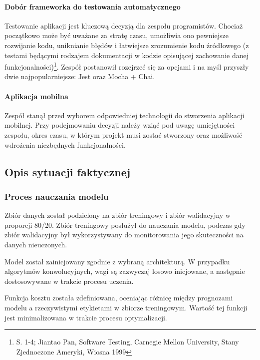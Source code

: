 \documentclass[12pt, a4paper, twoside, openany]{book}
\newcommand{\forceindent}{\leavevmode{\parindent=1.3em\indent}}
\begin{document}
\paragraph{Dobór frameworka do testowania automatycznego\\}
\forceindent Testowanie aplikacji jest kluczową decyzją dla zespołu programistów.
Chociaż początkowo może być uważane za stratę czasu, umożliwia ono pewniejsze rozwijanie kodu, uniknianie błędów i łatwiejsze zrozumienie kodu źródłowego (z testami będącymi rodzajem dokumentacji w kodzie opisującej zachowanie danej funkcjonalności)\footnote{S. 1-4; Jiantao Pan, Software Testing, Carnegie Mellon University, Stany Zjednoczone Ameryki, Wiosna 1999}.
Zespół postanowił rozejrzeć się za opcjami i na myśl przyszły dwie najpopularniejsze: Jest oraz Mocha + Chai.

\paragraph{Aplikacja mobilna\\}
\forceindent Zespół stanął przed wyborem odpowiedniej technologii do stworzenia aplikacji mobilnej. Przy podejmowaniu decyzji należy wziąć pod uwagę umiejętności zespołu, okres czasu, w którym projekt musi zostać stworzony oraz możliwość wdrożenia niezbędnych funkcjonalności.

\subsection{Opis sytuacji faktycznej}

\subsubsection{Proces nauczania modelu\\}
\forceindent Zbiór danych został podzielony na zbiór treningowy i zbiór walidacyjny w proporcji 80/20.
Zbiór treningowy posłużył do nauczania modelu, podczas gdy zbiór walidacyjny był wykorzystywany do monitorowania jego skuteczności na danych nieuczonych.

Model został zainicjowany zgodnie z wybraną architekturą. W przypadku algorytmów konwolucyjnych, wagi są zazwyczaj losowo inicjowane, a następnie dostosowywane w trakcie procesu uczenia.

Funkcja kosztu została zdefiniowana, oceniając różnicę między prognozami modelu a rzeczywistymi etykietami w zbiorze treningowym.
Wartość tej funkcji jest minimalizowana w trakcie procesu optymalizacji.
\end{document}
